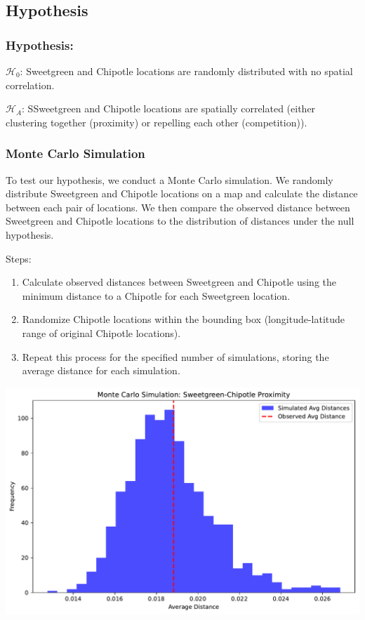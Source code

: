 \documentclass[
  letterpaper,
  DIV=11,
  numbers=noendperiod]{scrartcl}
\providecommand{\tightlist}{%
  \setlength{\itemsep}{0pt}\setlength{\parskip}{0pt}}\usepackage{longtable,booktabs,array}
\begin{document}
\subsection{Hypothesis}\label{hypothesis}

\subsubsection{Hypothesis:}\label{hypothesis-1}

\(\mathcal{H}_0\): Sweetgreen and Chipotle locations are randomly
distributed with no spatial correlation.

\(\mathcal{H}_A\): SSweetgreen and Chipotle locations are spatially
correlated (either clustering together (proximity) or repelling each
other (competition)).

\subsubsection{Monte Carlo Simulation}\label{monte-carlo-simulation}

To test our hypothesis, we conduct a Monte Carlo simulation. We randomly
distribute Sweetgreen and Chipotle locations on a map and calculate the
distance between each pair of locations. We then compare the observed
distance between Sweetgreen and Chipotle locations to the distribution
of distances under the null hypothesis.

Steps:

\begin{enumerate}
\def\labelenumi{\arabic{enumi}.}
\tightlist
\item
  Calculate observed distances between Sweetgreen and Chipotle using the
  minimum distance to a Chipotle for each Sweetgreen location.
\item
  Randomize Chipotle locations within the bounding box
  (longitude-latitude range of original Chipotle locations).
\item
  Repeat this process for the specified number of simulations, storing
  the average distance for each simulation.
\end{enumerate}

\includegraphics{index_files/figure-pdf/cell-7-output-1.pdf}
\end{document}
